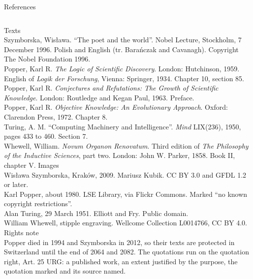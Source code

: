 \documentclass[aspectratio=169]{beamer}
\begin{document}
%
\begin{frame}{References}
  \vspace{-3mm}
  {\scriptsize
  \begin{columns}[T]
      Texts\\[4pt]
      {\color{muted}
      Szymborska, Wis\l{}awa. ``The poet and the world''. Nobel Lecture,
      Stockholm, 7 December 1996. Polish and English (tr. Bara\'nczak and
      Cavanagh). Copyright The Nobel Foundation 1996.\\[3pt]
      Popper, Karl R. \textit{The Logic of Scientific Discovery}. London:
      Hutchinson, 1959. English of \textit{Logik der Forschung}, Vienna:
      Springer, 1934. Chapter 10, section 85.\\[3pt]
      Popper, Karl R. \textit{Conjectures and Refutations: The Growth of
      Scientific Knowledge}. London: Routledge and Kegan Paul, 1963. Preface.\\[3pt]
      Popper, Karl R. \textit{Objective Knowledge: An Evolutionary Approach}.
      Oxford: Clarendon Press, 1972. Chapter 8.\\[3pt]
      Turing, A. M. ``Computing Machinery and Intelligence''. \textit{Mind}
      LIX(236), 1950, pages 433 to 460. Section 7.\\[3pt]
      Whewell, William. \textit{Novum Organon Renovatum}. Third edition of
      \textit{The Philosophy of the Inductive Sciences}, part two. London:
      John W. Parker, 1858. Book II, chapter V.}
      Images\\[4pt]
      {\color{muted}
      Wis\l{}awa Szymborska, Krak\'ow, 2009. Mariusz Kubik. CC BY 3.0 and
      GFDL 1.2 or later.\\[3pt]
      Karl Popper, about 1980. LSE Library, via Flickr Commons. Marked
      ``no known copyright restrictions''.\\[3pt]
      Alan Turing, 29 March 1951. Elliott and Fry. Public domain.\\[3pt]
      William Whewell, stipple engraving. Wellcome Collection L0014766,
      CC BY 4.0.}\\[5pt]
      Rights note\\[3pt]
      {\color{muted}Popper died in 1994 and Szymborska in 2012, so their texts
      are protected in Switzerland until the end of 2064 and 2082. The
      quotations run on the quotation right, Art. 25 URG: a published work, an
      extent justified by the purpose, the quotation marked and its source
      named.}
  \end{columns}}
\end{frame}
\end{document}
